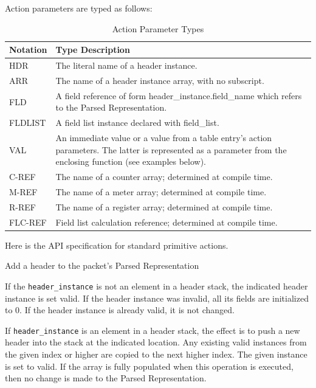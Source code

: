 \documentclass[12pt]{article}
\begin{document}
Action parameters are typed as follows:

\begin{table}[H]
\begin{center}
\begin{tabular}{| l | p{} |} \hline
\textbf{Notation} &
\textbf{Type Description} \\ \hline
HDR &
The literal name of a header instance. \\ \hline
ARR &
The name of a header instance array, with no subscript. \\ \hline
FLD &
A field reference of form header_instance.field_name which refers to the Parsed Representation. \\ \hline
FLDLIST &
A field list instance declared with field_list. \\ \hline
VAL &
An immediate value or a value from a table entry's action parameters. The latter is represented as a parameter from the enclosing function (see examples below). \\ \hline
C-REF &
The name of a counter array; determined at compile time. \\ \hline
M-REF &
The name of a meter array; determined at compile time. \\ \hline
R-REF &
The name of a register array; determined at compile time. \\ \hline
FLC-REF &
Field list calculation reference; determined at compile time. \\ \hline
\end{tabular}
\end{center}
\caption{Action Parameter Types}
\label{tab:actionparamtypes}
\end{table}


Here is the API specification for standard primitive actions.


{ %
Add a header to the packet's Parsed Representation
}
{ %
}
{ %
If the \texttt{header_instance} is not an element in a header stack, the indicated
header instance is set valid. If the header instance was invalid, all its
fields are initialized to 0. If the header instance is already valid, it is
not changed.

If \texttt{header_instance} is an element in a header stack, the effect is to push
a new header into the stack at the indicated location. Any existing valid
instances from the given index or higher are copied to the next higher index.
The given instance is set to valid. If the array is fully populated when this
operation is executed, then no change is made to the Parsed Representation.
}
\end{document}
